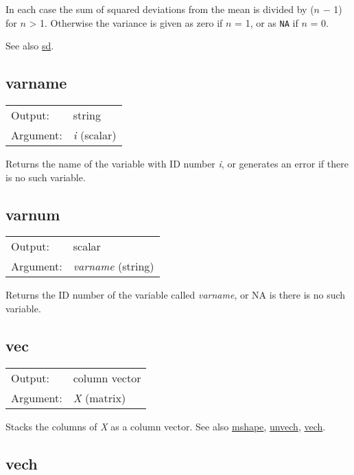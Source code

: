 	  In each case the sum of squared deviations from the mean is divided
	  by (\ensuremath{n} $-$ 1) for \ensuremath{n} > 1. Otherwise
	  the variance is given as zero if \ensuremath{n} = 1, or as
	  \texttt{NA} if \ensuremath{n} = 0.

	  See also \hyperlink{func-sd}{sd}.

\subsection{varname}
\hypertarget{func-varname}{}

\begin{tabular}{ll}
Output:     & string\\
Argument:   & \textsl{i} (scalar)\\
\end{tabular}

	  Returns the name of the variable with ID number
	  \textsl{i}, or generates an error if there is no such
	  variable.

\subsection{varnum}
\hypertarget{func-varnum}{}

\begin{tabular}{ll}
Output:     & scalar\\
Argument:   & \textsl{varname} (string)\\
\end{tabular}

	  Returns the ID number of the variable called
	  \textsl{varname}, or NA is there is no such variable.

\subsection{vec}
\hypertarget{func-vec}{}

\begin{tabular}{ll}
Output:     & column vector\\
Argument:   & \textsl{X} (matrix)\\
\end{tabular}

	  Stacks the columns of \textsl{X} as a column vector.
	  See also \hyperlink{func-mshape}{mshape}, \hyperlink{func-unvech}{unvech}, \hyperlink{func-vech}{vech}.

\subsection{vech}
\hypertarget{func-vech}{}

